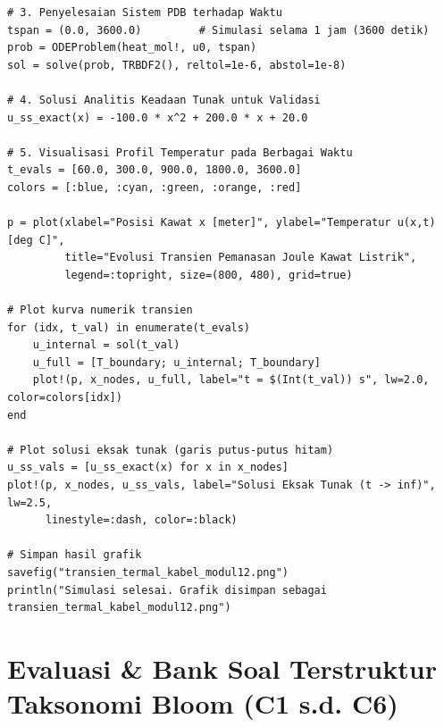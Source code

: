 \documentclass[11pt,a4paper]{article}
\theoremstyle{definition}
\begin{document}
\begin{lstlisting}[style=juliastyle, caption={Skrip Julia simulasi difusi panas kabel listrik dengan pemanasan internal Joule.}, label={lst:julia_heat_internal}]
# 3. Penyelesaian Sistem PDB terhadap Waktu
tspan = (0.0, 3600.0)         # Simulasi selama 1 jam (3600 detik)
prob = ODEProblem(heat_mol!, u0, tspan)
sol = solve(prob, TRBDF2(), reltol=1e-6, abstol=1e-8)

# 4. Solusi Analitis Keadaan Tunak untuk Validasi
u_ss_exact(x) = -100.0 * x^2 + 200.0 * x + 20.0

# 5. Visualisasi Profil Temperatur pada Berbagai Waktu
t_evals = [60.0, 300.0, 900.0, 1800.0, 3600.0]
colors = [:blue, :cyan, :green, :orange, :red]

p = plot(xlabel="Posisi Kawat x [meter]", ylabel="Temperatur u(x,t) [deg C]",
         title="Evolusi Transien Pemanasan Joule Kawat Listrik",
         legend=:topright, size=(800, 480), grid=true)

# Plot kurva numerik transien
for (idx, t_val) in enumerate(t_evals)
    u_internal = sol(t_val)
    u_full = [T_boundary; u_internal; T_boundary]
    plot!(p, x_nodes, u_full, label="t = $(Int(t_val)) s", lw=2.0, color=colors[idx])
end

# Plot solusi eksak tunak (garis putus-putus hitam)
u_ss_vals = [u_ss_exact(x) for x in x_nodes]
plot!(p, x_nodes, u_ss_vals, label="Solusi Eksak Tunak (t -> inf)", lw=2.5,
      linestyle=:dash, color=:black)

# Simpan hasil grafik
savefig("transien_termal_kabel_modul12.png")
println("Simulasi selesai. Grafik disimpan sebagai transien_termal_kabel_modul12.png")
\end{lstlisting}

\section{Evaluasi \& Bank Soal Terstruktur Taksonomi Bloom (C1 s.d. C6)}
\end{document}
